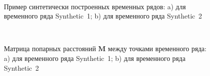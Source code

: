\documentclass[12pt, twoside]{article}
\numberwithin{equation}{section}
\begin{document}
\begin{figure}[h!t]\center
{}
\\
\caption{Пример синтетически построенных временных рядов: a) для временного ряда Synthetic~1; b) для временного ряда Synthetic~2}
\label{fig_synthetic_series}
\end{figure}

\begin{figure}[h!t]\center
{}
\\
\caption{Матрица попарных расстояний $\textbf{M}$ между точками временного ряда: a) для временного ряда Synthetic~1; b) для временного ряда Synthetic~2}
\label{fig_synthetic_distance}
\end{figure}
\end{document}

